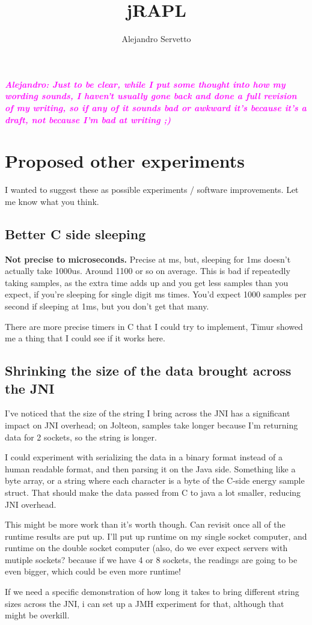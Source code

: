 \documentclass{article}
\title{jRAPL}
\author{Alejandro Servetto}
\newcommand{\anote}[1]{{\bf\it \textcolor{magenta}{Alejandro: #1}}}
\begin{document}
\maketitle

\anote{Just to be clear, while I put some thought into how my wording sounds, I haven't usually gone back and done a full revision of my writing, so if any of it sounds bad or awkward it's because it's a draft, not because I'm bad at writing ;)}







\section{Proposed other experiments}
    I wanted to suggest these as possible experiments / software improvements. Let me know what you think.

    \subsection{Better C side sleeping}
        \textbf{Not precise to microseconds.} Precise at ms, but, sleeping for 1ms doesn't actually take 1000us. Around 1100 or so on average. This is bad if repeatedly taking samples, as the extra time adds up and you get less samples than you expect, if you're sleeping for single digit ms times. You'd expect 1000 samples per second if sleeping at 1ms, but you don't get that many.
        
        There are more precise timers in C that I could try to implement, Timur showed me a thing that I could see if it works here.
        
    \subsection{Shrinking the size of the data brought across the JNI}
        I've noticed that the size of the string I bring across the JNI has a significant impact on JNI overhead; on Jolteon, samples take longer because I'm returning data for 2 sockets, so the string is longer.
        
        I could experiment with serializing the data in a binary format instead of a human readable format, and then parsing it on the Java side. Something like a byte array, or a string where each character is a byte of the C-side energy sample struct. That should make the data passed from C to java a lot smaller, reducing JNI overhead.
        
        This might be more work than it's worth though. Can revisit once all of the runtime results are put up. I'll put up runtime on my single socket computer, and runtime on the double socket computer (also, do we ever expect servers with mutiple sockets? because if we have 4 or 8 sockets, the readings are going to be even bigger, which could be even more runtime!
        
        If we need a specific demonstration of how long it takes to bring different string sizes across the JNI, i can set up a JMH experiment for that, although that might be overkill.


\end{document}
